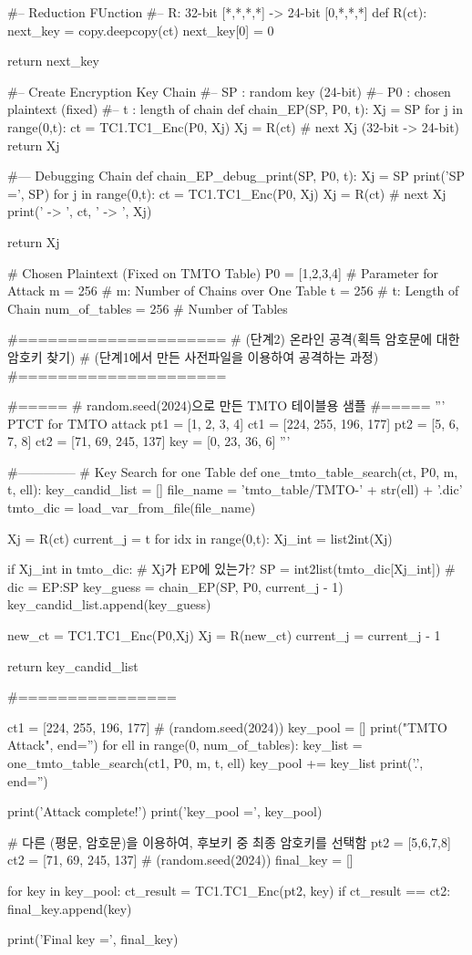 \begin{python}[TC1\_TMTO.py]
#-- Reduction FUnction
#-- R: 32-bit [*,*,*,*] -> 24-bit [0,*,*,*]
def R(ct):
   next_key = copy.deepcopy(ct)
   next_key[0] = 0
	
   return next_key

#-- Create Encryption Key Chain
#-- SP : random key (24-bit)
#-- P0 : chosen plaintext (fixed)
#-- t  : length of chain
def chain_EP(SP, P0, t):
   Xj = SP
   for j in range(0,t):
      ct = TC1.TC1_Enc(P0, Xj)
      Xj = R(ct)   # next Xj (32-bit -> 24-bit)
   return Xj

#--- Debugging Chain
def chain_EP_debug_print(SP, P0, t):
   Xj = SP
   print('SP =', SP)
   for j in range(0,t):
      ct = TC1.TC1_Enc(P0, Xj)
      Xj = R(ct)   # next Xj 
      print(' -> ', ct, ' -> ', Xj)
   
   return Xj

# Chosen Plaintext (Fixed on TMTO Table)
P0 = [1,2,3,4]
# Parameter for Attack
m = 256             # m: Number of Chains over One Table
t = 256             # t: Length of Chain
num_of_tables = 256 # Number of Tables


#=====================
# (단계2) 온라인 공격(획득 암호문에 대한 암호키 찾기)
# (단계1에서 만든 사전파일을 이용하여 공격하는 과정)
#=====================


#=====
# random.seed(2024)으로 만든 TMTO 테이블용 샘플
#=====
'''
PTCT for TMTO attack
pt1 = [1, 2, 3, 4]
ct1 = [224, 255, 196, 177]
pt2 = [5, 6, 7, 8]
ct2 = [71, 69, 245, 137]
key = [0, 23, 36, 6]
'''

#--------------
# Key Search for one Table
def one_tmto_table_search(ct, P0, m, t, ell):
   key_candid_list = []
   file_name = 'tmto_table/TMTO-' + str(ell) + '.dic'
   tmto_dic = load_var_from_file(file_name)

   Xj = R(ct)
   current_j = t
   for idx in range(0,t):
      Xj_int = list2int(Xj)

      if Xj_int in tmto_dic: # Xj가 EP에 있는가?
         SP = int2list(tmto_dic[Xj_int]) # dic = { EP:SP }
         key_guess = chain_EP(SP, P0, current_j - 1)
         key_candid_list.append(key_guess)

      new_ct = TC1.TC1_Enc(P0,Xj)
      Xj = R(new_ct)
      current_j = current_j - 1

   return key_candid_list


#================

ct1 = [224, 255, 196, 177] # (random.seed(2024))
key_pool = []
print("TMTO Attack", end='')
for ell in range(0, num_of_tables):
   key_list = one_tmto_table_search(ct1, P0, m, t, ell)
   key_pool += key_list
   print('.', end='')

print('\n Attack complete!\n')
print('key_pool =', key_pool)

# 다른 (평문, 암호문)을 이용하여, 후보키 중 최종 암호키를 선택함
pt2 = [5,6,7,8]
ct2 = [71, 69, 245, 137] # (random.seed(2024))
final_key = []

for key in key_pool:
   ct_result = TC1.TC1_Enc(pt2, key)
   if ct_result == ct2:
   final_key.append(key)

print('Final key =', final_key)   
\end{python}
\newpage
